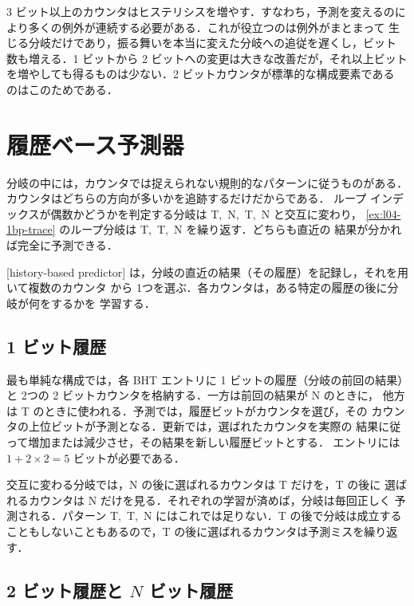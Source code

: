 \documentclass[../main.tex]{subfiles}
\begin{document}
3 ビット以上のカウンタはヒステリシスを増やす．すなわち，予測を変えるのに
より多くの例外が連続する必要がある．これが役立つのは例外がまとまって
生じる分岐だけであり，振る舞いを本当に変えた分岐への追従を遅くし，ビット
数も増える．1 ビットから 2 ビットへの変更は大きな改善だが，それ以上ビット
を増やしても得るものは少ない．2 ビットカウンタが標準的な構成要素である
のはこのためである．

\section{履歴ベース予測器}
\label{sec:l04-history}

分岐の中には，カウンタでは捉えられない規則的なパターンに従うものがある．
カウンタはどちらの方向が多いかを追跡するだけだからである．
ループ
インデックスが偶数かどうかを判定する分岐は T,~N,~T,~N と交互に変わり，
\cref{ex:l04-1bp-trace} のループ分岐は T,~T,~N を繰り返す．どちらも直近の
結果が分かれば完全に予測できる．

\begin{definition}[履歴ベース予測器]
  [history-based predictor]%
  は，分岐の直近の結果（その履歴）を記録し，それを用いて複数のカウンタ
  から 1つを選ぶ．各カウンタは，ある特定の履歴の後に分岐が何をするかを
  学習する．
\end{definition}

\subsection{1 ビット履歴}

最も単純な構成では，各 BHT エントリに 1 ビットの履歴（分岐の前回の結果）と
2つの 2 ビットカウンタを格納する．一方は前回の結果が N のときに，
他方は T のときに使われる．予測では，履歴ビットがカウンタを選び，その
カウンタの上位ビットが予測となる．更新では，選ばれたカウンタを実際の
結果に従って増加または減少させ，その結果を新しい履歴ビットとする．
エントリには $1 + 2\times 2 = 5$ ビットが必要である．

交互に変わる分岐では，N の後に選ばれるカウンタは T だけを，T の後に
選ばれるカウンタは N だけを見る．それぞれの学習が済めば，分岐は毎回正しく
予測される．パターン T,~T,~N にはこれでは足りない．T の後で分岐は成立する
こともしないこともあるので，T の後に選ばれるカウンタは予測ミスを繰り返す．

\subsection{2 ビット履歴と \texorpdfstring{$N$}{N} ビット履歴}
\end{document}

